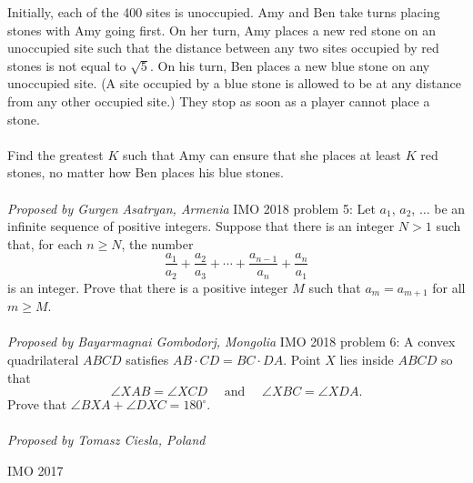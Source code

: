 Initially, each of the 400 sites is unoccupied. Amy and Ben take turns placing stones with Amy going first. On her turn, Amy places a new red stone on an unoccupied site such that the distance between any two sites occupied by red stones is not equal to $\sqrt{5}$. On his turn, Ben places a new blue stone on any unoccupied site. (A site occupied by a blue stone is allowed to be at any distance from any other occupied site.) They stop as soon as a player cannot place a stone. \\\\
Find the greatest $K$ such that Amy can ensure that she places at least $K$ red stones, no matter how Ben places his blue stones. \\\\
\textit{Proposed by Gurgen Asatryan, Armenia} 
IMO 2018 problem 5:  Let $a_1$, $a_2$, $\ldots$ be an infinite sequence of positive integers. Suppose that there is an integer $N > 1$ such that, for each $n \geq N$, the number
\[ \frac{a_1}{a_2} + \frac{a_2}{a_3} + \cdots + \frac{a_{n-1}}{a_n} + \frac{a_n}{a_1} \]
is an integer. Prove that there is a positive integer $M$ such that $a_m = a_{m+1}$ for all $m \geq M$. \\\\
\textit{Proposed by Bayarmagnai Gombodorj, Mongolia} 
IMO 2018 problem 6:  A convex quadrilateral $ABCD$ satisfies $AB\cdot CD = BC\cdot DA$. Point $X$ lies inside $ABCD$ so that
\[ \angle{XAB} = \angle{XCD}\quad\,\,\text{and}\quad\,\,\angle{XBC} = \angle{XDA}. \]
Prove that $\angle{BXA} + \angle{DXC} = 180^\circ$. \\\\
\textit{Proposed by Tomasz Ciesla, Poland} 

IMO 2017 

